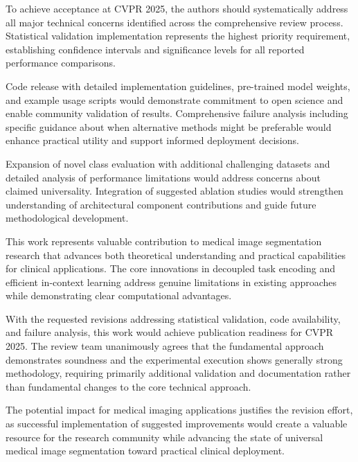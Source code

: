 To achieve acceptance at CVPR 2025, the authors should systematically address all major technical concerns identified across the comprehensive review process. Statistical validation implementation represents the highest priority requirement, establishing confidence intervals and significance levels for all reported performance comparisons.

Code release with detailed implementation guidelines, pre-trained model weights, and example usage scripts would demonstrate commitment to open science and enable community validation of results. Comprehensive failure analysis including specific guidance about when alternative methods might be preferable would enhance practical utility and support informed deployment decisions.

Expansion of novel class evaluation with additional challenging datasets and detailed analysis of performance limitations would address concerns about claimed universality. Integration of suggested ablation studies would strengthen understanding of architectural component contributions and guide future methodological development.

This work represents valuable contribution to medical image segmentation research that advances both theoretical understanding and practical capabilities for clinical applications. The core innovations in decoupled task encoding and efficient in-context learning address genuine limitations in existing approaches while demonstrating clear computational advantages.

With the requested revisions addressing statistical validation, code availability, and failure analysis, this work would achieve publication readiness for CVPR 2025. The review team unanimously agrees that the fundamental approach demonstrates soundness and the experimental execution shows generally strong methodology, requiring primarily additional validation and documentation rather than fundamental changes to the core technical approach.

The potential impact for medical imaging applications justifies the revision effort, as successful implementation of suggested improvements would create a valuable resource for the research community while advancing the state of universal medical image segmentation toward practical clinical deployment.

